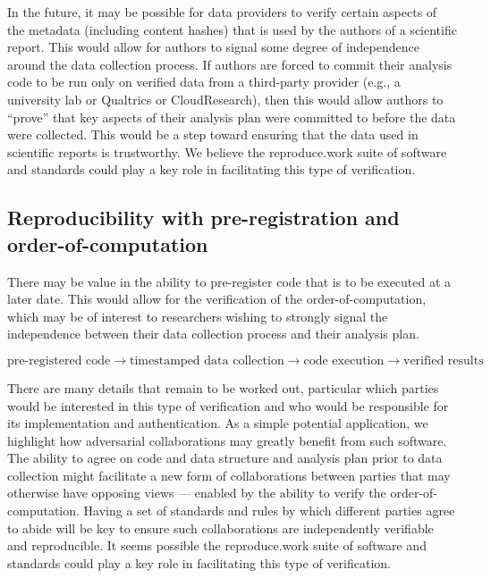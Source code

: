 In the future, it may be possible for data providers to verify certain aspects of the metadata (including content hashes) that is used by the authors of a scientific report. This would allow for authors to signal some degree of independence around the data collection process. If authors are forced to commit their analysis code to be run only on verified data from a third-party provider (e.g., a university lab or Qualtrics or CloudResearch), then this would allow authors to ``prove'' that key aspects of their analysis plan were committed to before the data were collected. This would be a step toward ensuring that the data used in scientific reports is trustworthy.
We believe the reproduce.work suite of software and standards could play a key role in facilitating this type of verification.

\hypertarget{reproducibility-with-pre-registration-and-order-of-computation}{%
\subsection{Reproducibility with pre-registration and order-of-computation}\label{reproducibility-with-pre-registration-and-order-of-computation}}

There may be value in the ability to pre-register code that is to be executed at a later date. This would allow for the verification of the order-of-computation, which may be of interest to researchers wishing to strongly signal the independence between their data collection process and their analysis plan.

$$ \text{pre-registered code} \rightarrow \text{timestamped data collection} \rightarrow \text{code execution} \rightarrow \text{verified results} $$

There are many details that remain to be worked out, particular which parties would be interested in this type of verification and who would be responsible for its implementation and authentication.
As a simple potential application, we highlight how adversarial collaborations may greatly benefit from such software. The ability to agree on code and data structure and analysis plan prior to data collection might facilitate a new form of collaborations between parties that may otherwise have opposing views --- enabled by the ability to verify the order-of-computation. Having a set of standards and rules by which different parties agree to abide will be key to ensure such collaborations are independently verifiable and reproducible.  It seems possible the reproduce.work suite of software and standards could play a key role in facilitating this type of verification.

